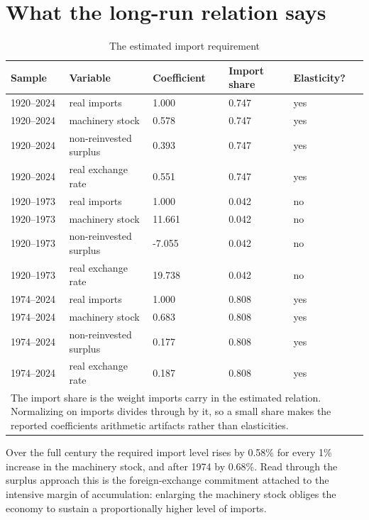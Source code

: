 \documentclass[11pt]{article}
\begin{document}
\FloatBarrier
\section{What the long-run relation says}

\begin{table}[H]
\centering
\caption{The estimated import requirement}
\begin{tabular}{p{2.2cm}p{3.6cm}p{2.4cm}p{3.0cm}p{2.6cm}}
\toprule
\textbf{Sample} & \textbf{Variable} & \textbf{Coefficient} & \textbf{Import share} & \textbf{Elasticity?} \\
\midrule
1920--2024 & real imports & 1.000 & 0.747 & yes \\
1920--2024 & machinery stock & 0.578 & 0.747 & yes \\
1920--2024 & non-reinvested surplus & 0.393 & 0.747 & yes \\
1920--2024 & real exchange rate & 0.551 & 0.747 & yes \\
1920--1973 & real imports & 1.000 & 0.042 & no \\
1920--1973 & machinery stock & 11.661 & 0.042 & no \\
1920--1973 & non-reinvested surplus & -7.055 & 0.042 & no \\
1920--1973 & real exchange rate & 19.738 & 0.042 & no \\
1974--2024 & real imports & 1.000 & 0.808 & yes \\
1974--2024 & machinery stock & 0.683 & 0.808 & yes \\
1974--2024 & non-reinvested surplus & 0.177 & 0.808 & yes \\
1974--2024 & real exchange rate & 0.187 & 0.808 & yes \\
\bottomrule
\multicolumn{5}{p{15.5cm}}{\footnotesize The import share is the weight imports carry in the estimated relation. Normalizing on imports divides through by it, so a small share makes the reported coefficients arithmetic artifacts rather than elasticities.} \\
\end{tabular}
\end{table}

Over the full century the required import level rises by 0.58\% for every 1\% increase in the machinery stock, and after 1974 by 0.68\%. Read through the surplus approach this is the foreign-exchange commitment attached to the intensive margin of accumulation: enlarging the machinery stock obliges the economy to sustain a proportionally higher level of imports.
\end{document}
